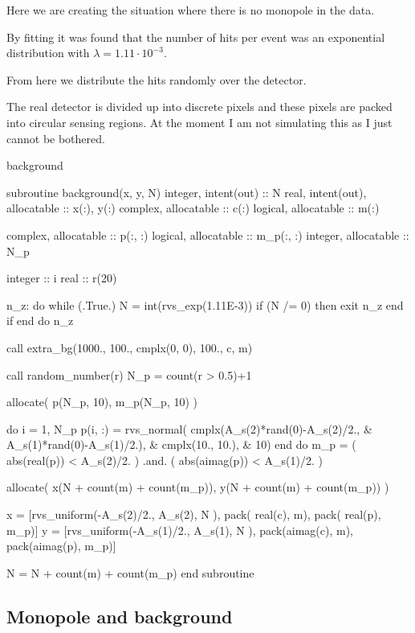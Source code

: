 \documentclass[10pt, a4paper]{article}
\begin{document}
Here we are creating the situation where there is no monopole in the data. 

By fitting it was found that the number of hits per event was an exponential distribution with $\lambda = 1.11 \cdot 10^{-3}$. 

From here we distribute the hits randomly over the detector. 

The real detector is divided up into discrete pixels and these pixels are packed into circular sensing regions. 
At the moment I am not simulating this as I just cannot be bothered. 

\begin{codeblock}{background}
\begin{code}
subroutine background(x, y, N)
	integer, intent(out) :: N
	real, intent(out), allocatable :: x(:), y(:)
	complex, allocatable :: c(:)
	logical, allocatable :: m(:)
	
	complex, allocatable :: p(:, :)
	logical, allocatable :: m_p(:, :)
	integer, allocatable :: N_p
	
	integer :: i 
	real :: r(20)
	
	n_z: do while (.True.)
		N = int(rvs_exp(1.11E-3))
		if (N /= 0) then 
			exit n_z 
		end if
	end do n_z
	
	call extra_bg(1000., 100., cmplx(0, 0), 100., c, m)
	
	call random_number(r)
	N_p = count(r > 0.5)+1
	
	allocate( p(N_p, 10),  m_p(N_p, 10) )

	do i = 1, N_p
		p(i, :) = rvs_normal( cmplx(A_s(2)*rand(0)-A_s(2)/2.,  &
		                            A_s(1)*rand(0)-A_s(1)/2.), &
		                      cmplx(10., 10.),                 &
		                      10)
	end do
	m_p = ( abs(real(p)) < A_s(2)/2. ) .and. ( abs(aimag(p)) < A_s(1)/2. )
	
	
	allocate( x(N + count(m) + count(m_p)), y(N + count(m) + count(m_p)) )
	
	x = [rvs_uniform(-A_s(2)/2., A_s(2), N ), pack( real(c), m), pack( real(p), m_p)]
	y = [rvs_uniform(-A_s(1)/2., A_s(1), N ), pack(aimag(c), m), pack(aimag(p), m_p)]
	
	N = N + count(m) + count(m_p)
end subroutine
\end{code}
\end{codeblock}

\subsection{Monopole and background}
\end{document}
